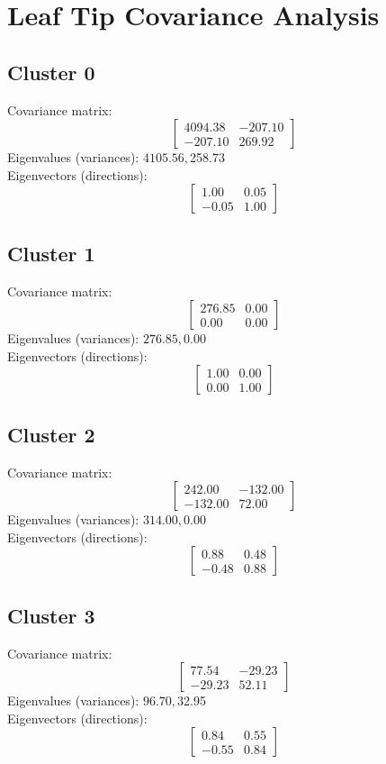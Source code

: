 \documentclass{article}
\begin{document}
\section*{Leaf Tip Covariance Analysis}
\subsection*{Cluster 0}
Covariance matrix:
\[\begin{bmatrix}4094.38 & -207.10 \\-207.10 & 269.92\end{bmatrix}\]
Eigenvalues (variances): $ 4105.56, $258.73\\
Eigenvectors (directions):
\[\begin{bmatrix}1.00 & 0.05 \\-0.05 & 1.00\end{bmatrix}\]
\subsection*{Cluster 1}
Covariance matrix:
\[\begin{bmatrix}276.85 & 0.00 \\0.00 & 0.00\end{bmatrix}\]
Eigenvalues (variances): $ 276.85, $0.00\\
Eigenvectors (directions):
\[\begin{bmatrix}1.00 & 0.00 \\0.00 & 1.00\end{bmatrix}\]
\subsection*{Cluster 2}
Covariance matrix:
\[\begin{bmatrix}242.00 & -132.00 \\-132.00 & 72.00\end{bmatrix}\]
Eigenvalues (variances): $ 314.00, $0.00\\
Eigenvectors (directions):
\[\begin{bmatrix}0.88 & 0.48 \\-0.48 & 0.88\end{bmatrix}\]
\subsection*{Cluster 3}
Covariance matrix:
\[\begin{bmatrix}77.54 & -29.23 \\-29.23 & 52.11\end{bmatrix}\]
Eigenvalues (variances): $ 96.70, $32.95\\
Eigenvectors (directions):
\[\begin{bmatrix}0.84 & 0.55 \\-0.55 & 0.84\end{bmatrix}\]
\end{document}
